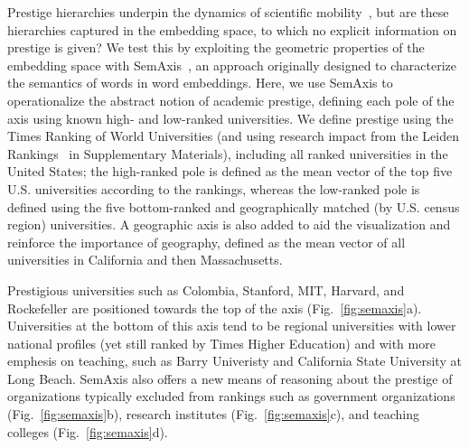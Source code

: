 \documentclass[12pt]{article} %
\begin{document}
Prestige hierarchies underpin the dynamics of scientific mobility~\autocite{deville2014career, clauset2015hierarchy}, but are these hierarchies captured in the embedding space, to which no explicit information on prestige is given?
We test this by exploiting the geometric properties of the embedding space with SemAxis~\autocite{an2018semaxis}, an approach originally designed to characterize the semantics of words in word embeddings.
Here, we use SemAxis to operationalize the abstract notion of academic prestige, defining each pole of the axis using known high- and low-ranked universities. 
We define prestige using the Times Ranking of World Universities (and using research impact from the Leiden Rankings~\autocite{waltman2012leidenrankings} in Supplementary Materials), including all ranked universities in the United States;
the high-ranked pole is defined as the mean vector of the top five U.S. universities according to the rankings, whereas the low-ranked pole is defined using the five bottom-ranked and geographically matched (by U.S. census region) universities.
A geographic axis is also added to aid the visualization and reinforce the importance of geography, defined as the mean vector of all universities in California and then Massachusetts. 

Prestigious universities such as Colombia, Stanford, MIT, Harvard, and Rockefeller are positioned towards the top of the axis (Fig.~\ref{fig:semaxis}a).
Universities at the bottom of this axis tend to be regional universities with lower national profiles (yet still ranked by Times Higher Education) and with more emphesis on teaching, such as Barry Univeristy and California State University at Long Beach.
SemAxis also offers a new means of reasoning about the prestige of organizations typically excluded from rankings such as government organizations (Fig.~\ref{fig:semaxis}b), research institutes (Fig.~\ref{fig:semaxis}c), and teaching colleges (Fig.~\ref{fig:semaxis}d).
\end{document}
